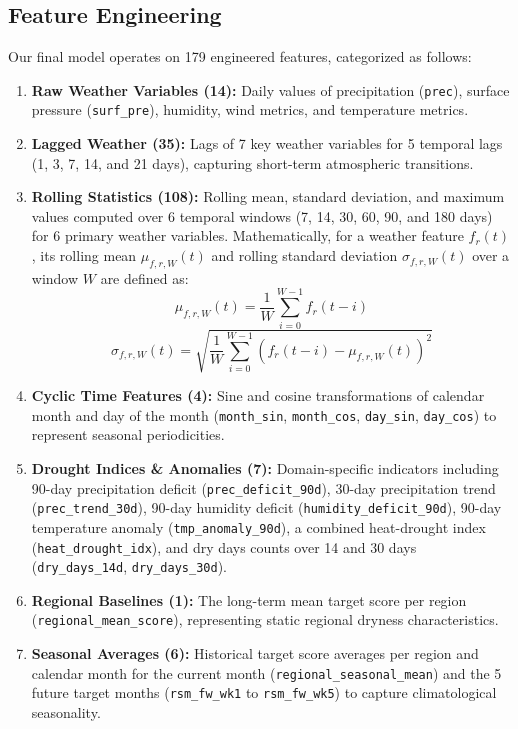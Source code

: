 \documentclass[conference]{IEEEtran}
\begin{document}
\subsection{Feature Engineering}
Our final model operates on 179 engineered features, categorized as follows:
\begin{enumerate}
    \item \textbf{Raw Weather Variables (14):} Daily values of precipitation (\texttt{prec}), surface pressure (\texttt{surf\_pre}), humidity, wind metrics, and temperature metrics.
    \item \textbf{Lagged Weather (35):} Lags of 7 key weather variables for 5 temporal lags (1, 3, 7, 14, and 21 days), capturing short-term atmospheric transitions.
    \item \textbf{Rolling Statistics (108):} Rolling mean, standard deviation, and maximum values computed over 6 temporal windows (7, 14, 30, 60, 90, and 180 days) for 6 primary weather variables. Mathematically, for a weather feature $f_{r}(t)$, its rolling mean $\mu_{f, r, W}(t)$ and rolling standard deviation $\sigma_{f, r, W}(t)$ over a window $W$ are defined as:
    \begin{equation}
        \mu_{f, r, W}(t) = \frac{1}{W} \sum_{i=0}^{W-1} f_{r}(t - i)
    \end{equation}
    \begin{equation}
        \sigma_{f, r, W}(t) = \sqrt{\frac{1}{W} \sum_{i=0}^{W-1} (f_{r}(t - i) - \mu_{f, r, W}(t))^2}
    \end{equation}
    \item \textbf{Cyclic Time Features (4):} Sine and cosine transformations of calendar month and day of the month (\texttt{month\_sin}, \texttt{month\_cos}, \texttt{day\_sin}, \texttt{day\_cos}) to represent seasonal periodicities.
    \item \textbf{Drought Indices \& Anomalies (7):} Domain-specific indicators including 90-day precipitation deficit (\texttt{prec\_deficit\_90d}), 30-day precipitation trend (\texttt{prec\_trend\_30d}), 90-day humidity deficit (\texttt{humidity\_deficit\_90d}), 90-day temperature anomaly (\texttt{tmp\_anomaly\_90d}), a combined heat-drought index (\texttt{heat\_drought\_idx}), and dry days counts over 14 and 30 days (\texttt{dry\_days\_14d}, \texttt{dry\_days\_30d}).
    \item \textbf{Regional Baselines (1):} The long-term mean target score per region (\texttt{regional\_mean\_score}), representing static regional dryness characteristics.
    \item \textbf{Seasonal Averages (6):} Historical target score averages per region and calendar month for the current month (\texttt{regional\_seasonal\_mean}) and the 5 future target months (\texttt{rsm\_fw\_wk1} to \texttt{rsm\_fw\_wk5}) to capture climatological seasonality.

\end{enumerate}
\end{document}
